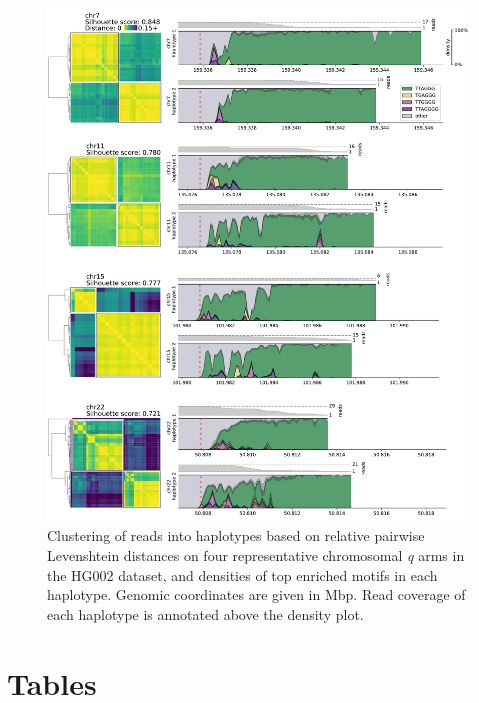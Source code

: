 \documentclass{article}
\newcommand{\beginsupplement}{
    \newpage
    \setcounter{page}{1}
    \renewcommand{\thepage}{S-\arabic{page}}
    \setcounter{table}{0}
    \renewcommand{\thetable}{S\arabic{table}}
    \setcounter{figure}{0}
    \renewcommand{\thefigure}{S\arabic{figure}}
 }
\begin{document}
\begin{figure}[ht!] \centering
\includegraphics[height=.9\textheight,width=\textwidth,keepaspectratio]{figures/HG002-levenshtein-densityplots.pdf}
\caption{
    Clustering of reads into haplotypes based on relative pairwise Levenshtein distances on four representative chromosomal \textit{q} arms in the HG002 dataset, and densities of top enriched motifs in each haplotype.
    Genomic coordinates are given in Mbp.
    Read coverage of each haplotype is annotated above the density plot.
}
\label{fig:levenshtein_q_arm}
\end{figure}
\clearpage \pagebreak

\pagebreak
\section*{Tables} 




\beginsupplement
\end{document}
